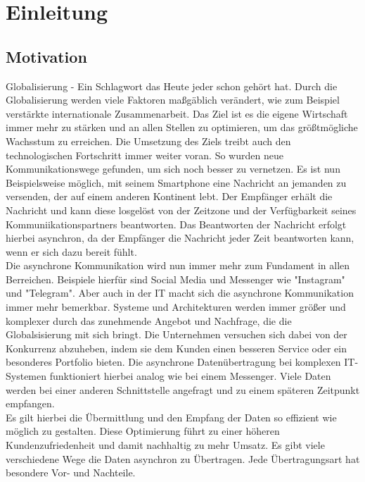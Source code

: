 \chapter{Einleitung}
\label{ch:intro}
%
%
\section{Motivation}
\label{sec:intro:motivation}
Globalisierung - Ein Schlagwort das Heute jeder schon gehört hat. Durch die Globalisierung werden viele Faktoren maßgäblich verändert, wie zum Beispiel verstärkte internationale Zusammenarbeit. 
Das Ziel ist es die eigene Wirtschaft immer mehr zu stärken und an allen Stellen zu optimieren, um das größtmögliche Wachsstum zu erreichen. Die Umsetzung des Ziels treibt auch den technologischen Fortschritt immer weiter voran. So wurden neue Kommunikationswege gefunden, um sich noch besser zu vernetzen.
Es ist nun Beispielsweise möglich, mit seinem Smartphone eine Nachricht an jemanden zu versenden, der auf einem anderen Kontinent lebt. Der Empfänger erhält die Nachricht und kann diese losgelöst von der Zeitzone und der Verfügbarkeit seines Kommuniikationspartners beantworten. 
Das Beantworten der Nachricht erfolgt hierbei asynchron, da der Empfänger die Nachricht jeder Zeit beantworten kann, wenn er sich dazu bereit fühlt. \\

Die asynchrone Kommunikation wird nun immer mehr zum Fundament in allen Berreichen. Beispiele hierfür sind Social Media und Messenger wie "Instagram" und "Telegram". Aber auch in der IT macht sich die asynchrone Kommunikation immer mehr bemerkbar. 
Systeme und Architekturen werden immer größer und komplexer durch das zunehmende Angebot und Nachfrage, die die Globalsisierung mit sich bringt. Die Unternehmen versuchen sich dabei von der Konkurrenz abzuheben, indem sie dem Kunden einen besseren Service oder ein besonderes Portfolio bieten. 
Die asynchrone Datenübertragung bei komplexen IT-Systemen funktioniert hierbei analog wie bei einem Messenger. Viele Daten werden bei einer anderen Schnittstelle angefragt und zu einem späteren Zeitpunkt empfangen.\\

Es gilt hierbei die Übermittlung und den Empfang der Daten so effizient wie möglich zu gestalten.
Diese Optimierung führt zu einer höheren Kundenzufriedenheit und damit nachhaltig zu mehr Umsatz.
Es gibt viele verschiedene Wege die Daten asynchron zu Übertragen. Jede Übertragungsart hat besondere Vor- und Nachteile.\\

